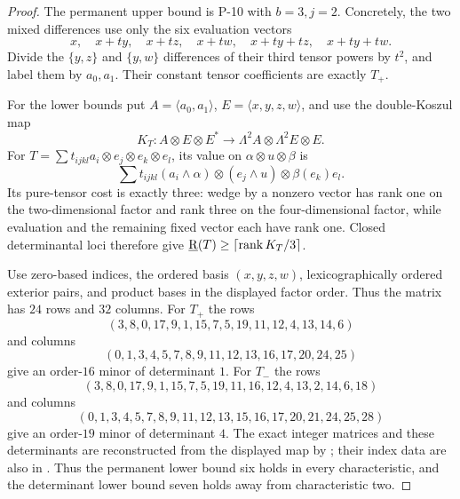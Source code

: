 \begin{proof}
The permanent upper bound is P-10 with $b=3,j=2$.
Concretely, the two mixed differences use only the six
evaluation vectors
\[
 x,\quad x+ty,\quad x+tz,\quad x+tw,\quad
 x+ty+tz,\quad x+ty+tw.
\]
Divide the $\{y,z\}$ and $\{y,w\}$ differences of
their third tensor powers by $t^2$, and label them by
$a_0,a_1$. Their constant tensor coefficients are
exactly $T_+$.

For the lower bounds put $A=\langle a_0,a_1\rangle$,
$E=\langle x,y,z,w\rangle$, and use the double-Koszul map
\[
 K_T:A\otimes E\otimes E^*
       \longrightarrow\Lambda^2A\otimes\Lambda^2E\otimes E.
\]
For $T=\sum t_{ijkl}a_i\otimes e_j\otimes e_k\otimes e_l$,
its value on $\alpha\otimes u\otimes\beta$ is
\[
 \sum t_{ijkl}(a_i\wedge\alpha)\otimes(e_j\wedge u)
                   \otimes\beta(e_k)e_l.
\]
Its pure-tensor cost is exactly three: wedge by a nonzero
vector has rank one on the two-dimensional factor and
rank three on the four-dimensional factor, while evaluation
and the remaining fixed vector each have rank one.
Closed determinantal loci therefore give
$\underline{\mathrm R}(T)\geq\lceil\operatorname{rank}K_T/3\rceil$.

Use zero-based indices, the ordered basis $(x,y,z,w)$,
lexicographically ordered exterior pairs, and product
bases in the displayed factor order. Thus the matrix
has $24$ rows and $32$ columns. For $T_+$ the rows
\[
 (3,8,0,17,9,1,15,7,5,19,11,12,4,13,14,6)
\]
and columns
\[
 (0,1,3,4,5,7,8,9,11,12,13,16,17,20,24,25)
\]
give an order-$16$ minor of determinant $1$.
For $T_-$ the rows
\[
 (3,8,0,17,9,1,15,7,5,19,11,16,12,4,13,2,14,6,18)
\]
and columns
\[
 (0,1,3,4,5,7,8,9,11,12,13,15,16,17,20,21,24,25,28)
\]
give an order-$19$ minor of determinant $4$.
The exact integer matrices and these determinants are
reconstructed from the displayed map by
; their index data are
also in .
Thus the permanent lower bound six holds in every
characteristic, and the determinant lower bound seven
holds away from characteristic two.


\end{proof}
